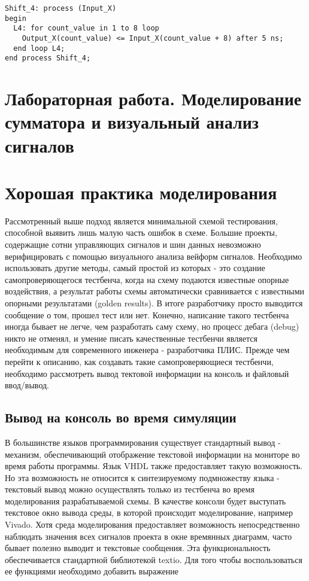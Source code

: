 \begin{Code}
\begin{lstlisting}[caption=Цикл For, label=loop_4]
Shift_4: process (Input_X)
begin
  L4: for count_value in 1 to 8 loop
    Output_X(count_value) <= Input_X(count_value + 8) after 5 ns;
  end loop L4;
end process Shift_4;
\end{lstlisting}
\end{Code}


\section{Лабораторная работа. Моделирование сумматора и визуальный анализ сигналов}



\section{Хорошая практика моделирования}

Рассмотренный выше подход является минимальной схемой тестирования, способной выявить лишь малую часть ошибок в схеме. Большие проекты, содержащие сотни управляющих сигналов и шин данных невозможно верифицировать с помощью визуального анализа вейформ сигналов. Необходимо использовать другие методы, самый простой из которых - это создание самопроверяющегося тестбенча, когда на схему подаются известные опорные воздействия, а результат работы схемы автоматически сравнивается с известными опорными результатами (golden results). В итоге разработчику просто выводится сообщение о том, прошел тест или нет. Конечно, написание такого тестбенча иногда бывает не легче, чем разработать саму схему, но процесс дебага (debug) никто не отменял, и умение писать качественные тестбенчи является необходимым для современного инженера - разработчика ПЛИС. Прежде чем перейти к описанию, как создавать такие самопроверяющиеся тестбенчи, необходимо рассмотреть вывод тектовой информации на консоль и файловый ввод/вывод.

\subsection{Вывод на консоль во время симуляции}

В большинстве языков программирования существует стандартный вывод - механизм, обеспечивающий отображение текстовой информации на мониторе во время работы программы. Язык VHDL также предоставляет такую возможность. Но эта возможность не относится к синтезируемому подмножеству языка - текстовый вывод можно осуществлять только из тестбенча во время моделирования разрабатываемой схемы. В качестве консоли будет выступать текстовое окно вывода среды, в которой происходит моделирование, например Vivado. Хотя среда моделирования предоставляет возможность непосредственно наблюдать значения всех сигналов проекта в окне времянных диаграмм, часто бывает полезно выводит и текстовые сообщения. Эта функциональность обеспечивается стандартной библиотекой textio. Для того чтобы воспользоваться ее функциями необходимо добавить выражение

